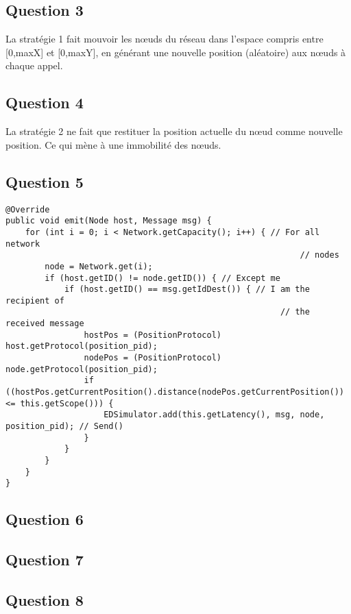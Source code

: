 \documentclass[10pt]{report}
\begin{document}
\subsection{Question 3}
La stratégie 1 fait mouvoir les nœuds du réseau dans l'espace compris entre [0,maxX] et [0,maxY], en générant une nouvelle position (aléatoire) aux nœuds à chaque appel.

\subsection{Question 4}
La stratégie 2 ne fait que restituer la position actuelle du nœud comme nouvelle position. Ce qui mène à une immobilité des nœuds.

\subsection{Question 5}

\noindent\begin{minipage}{\textwidth}
\begin{shaded}
\begin{lstlisting}
@Override
public void emit(Node host, Message msg) {
	for (int i = 0; i < Network.getCapacity(); i++) { // For all network
															// nodes
		node = Network.get(i);
		if (host.getID() != node.getID()) { // Except me
			if (host.getID() == msg.getIdDest()) { // I am the recipient of
														// the received message
				hostPos = (PositionProtocol) host.getProtocol(position_pid);
				nodePos = (PositionProtocol) node.getProtocol(position_pid);
				if ((hostPos.getCurrentPosition().distance(nodePos.getCurrentPosition()) <= this.getScope())) {
					EDSimulator.add(this.getLatency(), msg, node, position_pid); // Send()
				}
			}
		}
	}
}
\end{lstlisting}
\end{shaded}
\end{minipage}



\subsection{Question 6}
\subsection{Question 7}
\subsection{Question 8}
\end{document}
